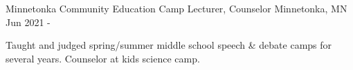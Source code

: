 

\begin{cventries}  
  \cventry
    {Minnetonka Community Education} %
    {Camp Lecturer, Counselor} %
    {Minnetonka, MN} %
    {Jun 2021 - } %
    {
      \begin{cvitems} %
        \item {Taught and judged spring/summer middle school speech \& debate camps for several years. Counselor at kids science camp.}
      \end{cvitems}
    }
\end{cventries}
